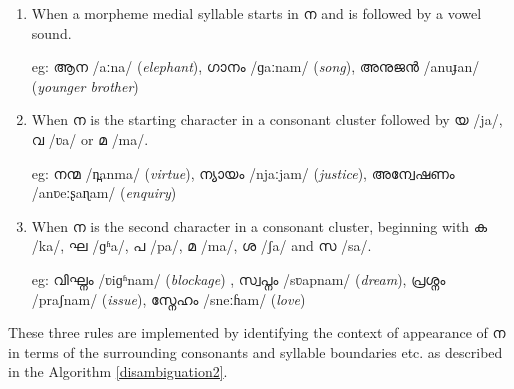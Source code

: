 \documentclass{ieeeaccess}
\begin{document}
\begin{enumerate}
	\item When a morpheme medial syllable starts in {\mal ന} and is followed by a vowel sound.

	      eg: {\mal ആന} {\ipa /aːna/} (\textit{elephant}), {\mal ഗാനം} {\ipa /ɡaːnam/} (\textit{song}), {\mal അനുജൻ} {\ipa /anuɟan/} (\textit{younger brother})
	\item When {\mal ന} is the starting character in a consonant cluster followed by {\mal യ} {\ipa /ja/}, {\mal വ}  {\ipa /ʋa/} or {\mal മ} {\ipa /ma/}.

	      eg: {\mal നന്മ} {\ipa /n̪anma/} (\textit{virtue}), {\mal ന്യായം} {\ipa /njaːjam/} (\textit{justice}), {\mal അന്വേഷണം} {\ipa /anʋeːʂaɳam/ }(\textit{enquiry})
	\item When {\mal ന} is the second character in a consonant cluster, beginning with {\mal ക} {\ipa /ka/}, {\mal ഘ} {\ipa /ɡʱa/}, {\mal പ} {\ipa /pa/}, {\mal മ} {\ipa /ma/}, {\mal ശ} {\ipa /ʃa/} and {\mal സ} {\ipa /sa/}.

	      eg: {\mal വിഘ്നം} {\ipa /ʋiɡʱnam/} (\textit{blockage}) , {\mal സ്വപ്നം} {\ipa /sʋapnam/} (\textit{dream}), {\mal പ്രശ്നം} {\ipa /praʃnam/} (\textit{issue}), {\mal സ്നേഹം} {\ipa /sneːɦam/} (\textit{love})

\end{enumerate}

These three rules are implemented by identifying the context of appearance of {\mal ന} in terms of the surrounding consonants and syllable boundaries etc. as described in the Algorithm \ref{disambiguation2}.


%

\end{document}
